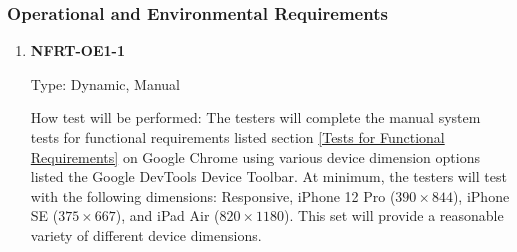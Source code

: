 \documentclass[12pt, titlepage]{article}
\begin{document}
\subsubsection{Operational and Environmental Requirements}
\begin{enumerate}

	\item \textbf{NFRT-OE1-1} %

	      Type: Dynamic, Manual

	      How test will be performed: The testers will complete the manual system tests for functional
	      requirements listed section \ref{Tests for Functional Requirements} on Google Chrome using various
	      device dimension options listed the Google DevTools Device Toolbar. At minimum, the testers will
	      test with the following dimensions: Responsive, iPhone 12 Pro ($390 \times 844$), iPhone SE ($375
		      \times 667$), and iPad Air ($820 \times 1180$). This set will provide a reasonable variety of
	      different device dimensions.

\end{enumerate}
\end{document}
